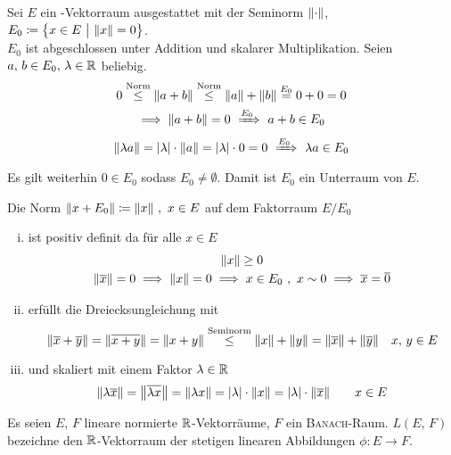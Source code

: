 \documentclass{anablatt}
\begin{document}
\makeheader

\task Sei $E$ ein \R-Vektorraum ausgestattet mit der Seminorm $\norm{\cdot}$, $E_0 \coloneqq \qty{x \in E ~\big\vert~ \norm{x} = 0}$. \\

$E_0$ ist abgeschlossen unter Addition und skalarer Multiplikation. Seien $a,\, b \in E_0,\, \lambda \in \mathbb{R}$ beliebig.
\begin{gather*}
    0 \stackrel{\text{Norm}}\leq \norm{a+b} \stackrel{\text{Norm}}\leq \norm{a} + \norm{b} \stackrel{E_0}= 0 + 0 = 0 \\
    \implies \norm{a+b} = 0 ~\xRightarrow{E_0}~ a + b \in E_0 \\
    \norm{\lambda a} = |\lambda| \cdot \norm{a} = |\lambda| \cdot 0 = 0 ~\xRightarrow{E_0}~ \lambda a \in E_0
\end{gather*}
Es gilt weiterhin $0 \in E_0$ sodass $E_0 \neq \emptyset$. Damit ist $E_0$ ein Unterraum von $E$.

Die Norm $\norm{x + E_0} \coloneqq \norm{x} ~,~ x \in E$ auf dem Faktorraum $E/E_0$
\begin{enumerate}[(i)]
\item ist positiv definit da für alle $x \in E$
\begin{gather*}
    \norm{x} \geq 0 \\
    \norm{\overline x} = 0 \implies \norm{x} = 0 \implies x \in E_0 ~,~ x \sim 0 \implies \overline x = \overline 0
\end{gather*}
\item erfüllt die Dreiecksungleichung mit
    \[ \norm{\overline x + \overline y} = \norm{\overline{x+y}} = \norm{x + y} \stackrel{\text{Seminorm}}\leq \norm{x} + \norm{y} = \norm{\overline x} + \norm{\overline y} \quad x,\, y \in E\]
\item und skaliert mit einem Faktor $\lambda \in \mathbb{R}$
    \[ \norm{\lambda \overline x} = \norm{\overline{\lambda x}} = \norm{\lambda x} = |\lambda|\cdot\norm{x} = |\lambda|\cdot\norm{\overline x} \qquad x \in E \]
\end{enumerate}
\task Es seien $E,\,F$ lineare normierte $\mathbb{R}$-Vektorräume, $F$ ein \textsc{Banach}-Raum. $L(E,\,F)$ bezeichne den $\mathbb{R}$-Vektorraum der stetigen linearen Abbildungen $\phi:E \rightarrow F$.
\\
\end{document}
